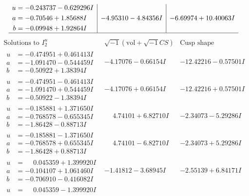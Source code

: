 \documentclass[1p]{elsarticle_modified}
\theoremstyle{definition}
\newcommand{\I}{\sqrt{-1}}
\begin{document}
$$\begin{array}{c|c|c}
\begin{aligned}
u &= -0.243737 - 0.629296 I \\
a &= -0.70546 + 1.85688 I \\
b &= -0.09948 + 1.92864 I\end{aligned}
 & -4.95310 - 4.84356 I & -6.69974 + 10.40063 I\\
 \hline 
 \end{array}$$\newpage$$\begin{array}{c|c|c}  
\text{Solutions to }I^u_{2}& \I (\text{vol} + \sqrt{-1}CS) & \text{Cusp shape}\\
 \hline 
\begin{aligned}
u &= -0.474951 + 0.461413 I \\
a &= -1.091470 - 0.544459 I \\
b &= -0.50922 + 1.38394 I\end{aligned}
 & -4.17076 - 0.66154 I & -12.42216 - 0.57501 I \\ \hline\begin{aligned}
u &= -0.474951 - 0.461413 I \\
a &= -1.091470 + 0.544459 I \\
b &= -0.50922 - 1.38394 I\end{aligned}
 & -4.17076 + 0.66154 I & -12.42216 + 0.57501 I \\ \hline\begin{aligned}
u &= -0.185881 + 1.371650 I \\
a &= -0.768578 - 0.655345 I \\
b &= -1.86428 - 0.88713 I\end{aligned}
 & \phantom{-}4.74101 + 6.82710 I & -2.34073 - 5.29286 I \\ \hline\begin{aligned}
u &= -0.185881 - 1.371650 I \\
a &= -0.768578 + 0.655345 I \\
b &= -1.86428 + 0.88713 I\end{aligned}
 & \phantom{-}4.74101 - 6.82710 I & -2.34073 + 5.29286 I \\ \hline\begin{aligned}
u &= \phantom{-}0.045359 + 1.399920 I \\
a &= -0.104107 + 1.061460 I \\
b &= -0.706910 - 0.416082 I\end{aligned}
 & -1.41812 - 3.68945 I & -2.55139 + 6.84171 I \\ \hline\begin{aligned}
u &= \phantom{-}0.045359 - 1.399920 I \\

\end{aligned}
\end{array}$$
\end{document}

